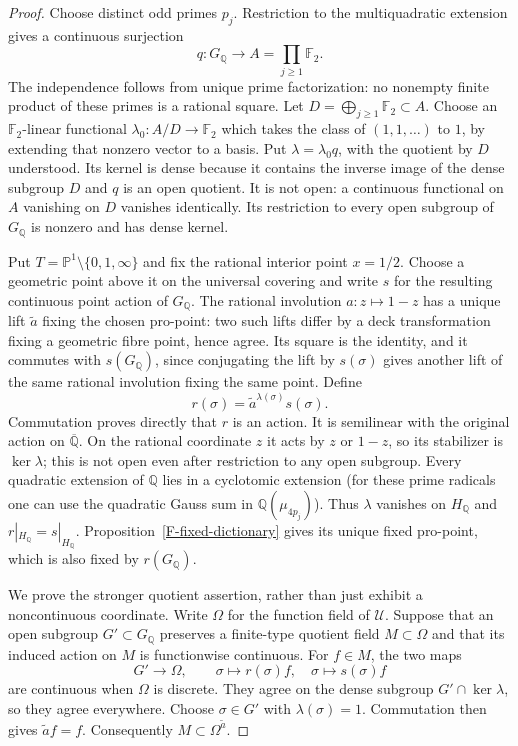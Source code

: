 \documentclass[11pt,oneside]{article}
\begin{document}
\begin{proof}
Choose distinct odd primes $p_j$. Restriction to the
multiquadratic extension gives a continuous surjection
\[
 q:G_{\mathbb Q}\longrightarrow
                  A=\prod_{j\ge1}\mathbb F_2.
\]
The independence follows from unique prime factorization:
no nonempty finite product of these primes is a rational
square. Let $D=\bigoplus_{j\ge1}\mathbb F_2\subset A$.
Choose an $\mathbb F_2$-linear functional
$\lambda_0:A/D\to\mathbb F_2$ which takes the class of
$(1,1,\ldots)$ to $1$, by extending that nonzero vector
to a basis. Put $\lambda=\lambda_0q$, with the quotient
by $D$ understood. Its kernel is dense because it contains
the inverse image of the dense subgroup $D$ and $q$ is
an open quotient. It is not open: a continuous functional
on $A$ vanishing on $D$ vanishes identically. Its
restriction to every open subgroup of $G_{\mathbb Q}$
is nonzero and has dense kernel.

Put $T=\mathbb P^1\setminus\{0,1,\infty\}$ and fix the
rational interior point $x=1/2$. Choose a geometric point
above it on the universal covering and write $s$ for the
resulting continuous point action of $G_{\mathbb Q}$.
The rational involution $a:z\mapsto1-z$ has a unique lift
$\widetilde a$ fixing the chosen pro-point: two such lifts
differ by a deck transformation fixing a geometric fibre
point, hence agree. Its square is the identity, and it
commutes with $s(G_{\mathbb Q})$, since conjugating the
lift by $s(\sigma)$ gives another lift of the same rational
involution fixing the same point. Define
\[
 r(\sigma)=\widetilde a^{\lambda(\sigma)}s(\sigma).
\]
Commutation proves directly that $r$ is an action. It is
semilinear with the original action on $\overline{\mathbb Q}$.
On the rational coordinate $z$ it acts by $z$ or $1-z$,
so its stabilizer is $\ker\lambda$; this is not open even
after restriction to any open subgroup. Every quadratic
extension of $\mathbb Q$ lies in a cyclotomic extension
(for these prime radicals one can use the quadratic Gauss
sum in $\mathbb Q(\mu_{4p_j})$). Thus $\lambda$ vanishes
on $H_{\mathbb Q}$ and $r|_{H_{\mathbb Q}}=s|_{H_{\mathbb Q}}$.
Proposition~\ref{F-fixed-dictionary} gives its unique fixed
pro-point, which is also fixed by $r(G_{\mathbb Q})$.

We prove the stronger quotient assertion, rather than
just exhibit a noncontinuous coordinate. Write $\Omega$
for the function field of $\mathcal U$. Suppose that an
open subgroup $G'\subset G_{\mathbb Q}$ preserves a
finite-type quotient field $M\subset\Omega$ and that
its induced action on $M$ is functionwise continuous.
For $f\in M$, the two maps
\[
 G'\longrightarrow\Omega,\qquad
 \sigma\longmapsto r(\sigma)f,\quad
 \sigma\longmapsto s(\sigma)f
\]
are continuous when $\Omega$ is discrete. They agree on
the dense subgroup $G'\cap\ker\lambda$, so they agree
everywhere. Choose $\sigma\in G'$ with $\lambda(\sigma)=1$.
Commutation then gives $\widetilde a f=f$. Consequently
$M\subset\Omega^{\widetilde a}$.


\end{proof}
\end{document}
